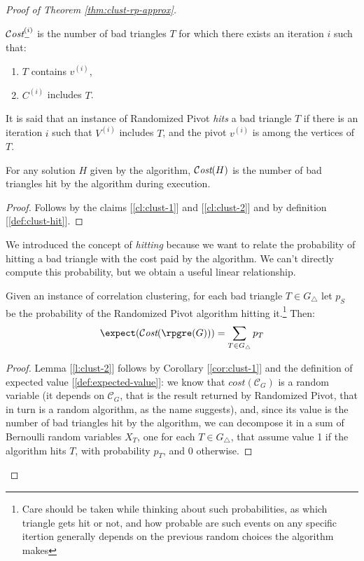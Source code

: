 \begin{proof}[Proof of Theorem \ref{thm:clust-rp-approx}]
    \begin{claim}\label{cl:clust-2}
        $\mathcal{C}\textit{ost}_-^{(i)}$ is the number of bad triangles $T$ for which there exists an iteration $i$ such that:
        \begin{enumerate}
            \item $T$ contains $v^{(i)}$,
            \item $C^{(i)}$ includes $T$.
        \end{enumerate}
    \end{claim}

    \begin{definition}[Hit]\label{def:clust-hit}
        It is said that an instance of Randomized Pivot \emph{hits} a bad triangle $T$ if there is an iteration $i$ such that $V^{(i)}$ includes $T$, and the pivot $v^{(i)}$ is among the vertices of $T$.
    \end{definition}

    \begin{corollary}\label{cor:clust-1}
        For any solution $H$ given by the algorithm, $\mathcal{C}\textit{ost}(H)$ is the number of bad triangles hit by the algorithm during execution.
    \end{corollary}

    \begin{proof}
        Follows by the claims [\ref{cl:clust-1}] and [\ref{cl:clust-2}] and by definition [\ref{def:clust-hit}].
    \end{proof}
    
    We introduced the concept of \textit{hitting} because we want to relate the probability of hitting a bad triangle with the cost paid by the algorithm. We can't directly compute this probability, but we obtain a useful linear relationship.
    \begin{lemma}\label{l:clust-2}
        Given an instance of correlation clustering, for each bad triangle $T \in G_\triangle$ let $p_S$ be the probability of the Randomized Pivot algorithm hitting it.\footnote{Care should be taken while thinking about such probabilities, as which triangle gets hit or not, and how probable are such events on any specific itertion generally depends on the previous random choices the algorithm makes} Then:
        \[
            \expect(\cost(\rpgre(G))) = \sum_{T \in G_\triangle} p_T
        \]
    \end{lemma}

    \begin{proof}
        Lemma [\ref{l:clust-2}] follows by Corollary [\ref{cor:clust-1}] and the definition of expected value [\ref{def:expected-value}]: we know that $cost(\mathscr{C}_G)$ is a random variable (it depends on $\mathscr{C}_G$, that is the result returned by Randomized Pivot, that in turn is a random algorithm, as the name suggests), and, since its value is the number of bad triangles hit by the algorithm, we can decompose it in a sum of Bernoulli random variables $X_T$, one for each $T \in G_\triangle$, that assume value 1 if the algorithm hits $T$, with probability $p_T$, and 0 otherwise.
    \end{proof}


\end{proof}
